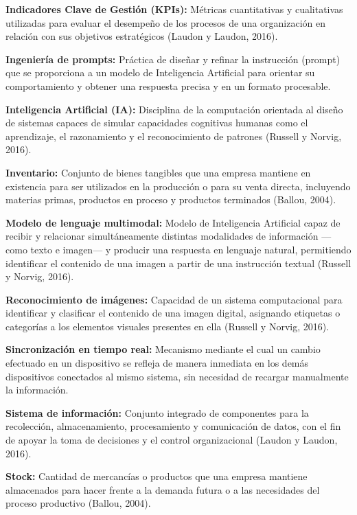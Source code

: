 \documentclass[12pt, letterpaper]{report}
\begin{document}
\textbf{Indicadores Clave de Gestión (KPIs):} Métricas cuantitativas y
cualitativas utilizadas para evaluar el desempeño de los procesos de una
organización en relación con sus objetivos estratégicos (Laudon y
Laudon, 2016).

\textbf{Ingeniería de prompts:} Práctica de diseñar y refinar la
instrucción (prompt) que se proporciona a un modelo de Inteligencia
Artificial para orientar su comportamiento y obtener una respuesta
precisa y en un formato procesable.

\textbf{Inteligencia Artificial (IA):} Disciplina de la computación
orientada al diseño de sistemas capaces de simular capacidades cognitivas
humanas como el aprendizaje, el razonamiento y el reconocimiento de
patrones (Russell y Norvig, 2016).

\textbf{Inventario:} Conjunto de bienes tangibles que una empresa
mantiene en existencia para ser utilizados en la producción o para su
venta directa, incluyendo materias primas, productos en proceso y
productos terminados (Ballou, 2004).

\textbf{Modelo de lenguaje multimodal:} Modelo de Inteligencia
Artificial capaz de recibir y relacionar simultáneamente distintas
modalidades de información ---como texto e imagen--- y producir una
respuesta en lenguaje natural, permitiendo identificar el contenido de
una imagen a partir de una instrucción textual (Russell y Norvig,
2016).

\textbf{Reconocimiento de imágenes:} Capacidad de un sistema
computacional para identificar y clasificar el contenido de una imagen
digital, asignando etiquetas o categorías a los elementos visuales
presentes en ella (Russell y Norvig, 2016).

\textbf{Sincronización en tiempo real:} Mecanismo mediante el cual un
cambio efectuado en un dispositivo se refleja de manera inmediata en
los demás dispositivos conectados al mismo sistema, sin necesidad de
recargar manualmente la información.

\textbf{Sistema de información:} Conjunto integrado de componentes para
la recolección, almacenamiento, procesamiento y comunicación de datos,
con el fin de apoyar la toma de decisiones y el control organizacional
(Laudon y Laudon, 2016).

\textbf{Stock:} Cantidad de mercancías o productos que una empresa
mantiene almacenados para hacer frente a la demanda futura o a las
necesidades del proceso productivo (Ballou, 2004).

\end{document}
